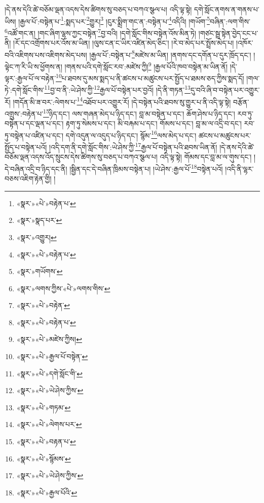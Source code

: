 །དེ་ནས་དེའི་ཚེ་བཅོམ་ལྡན་འདས་དེས་ཚིགས་སུ་བཅད་པ་བཀའ་སྩལ་པ། འདི་ལྟ་སྟེ། དགེ་སློང་ནགས་ན་གནས་པ་ཡིས། །རྒྱལ་པོ་:བསྟེན་པ་\footnote{«སྣར་»«པེ་»བརྟེན་པ་}:སྨད་པར་\footnote{«སྣར་»སྣད་པར་}གྱུར།\footnote{«སྣར་»འགྱུར།} །ངུར་སྨྲིག་གང་ན་:བསྟེན་པ་\footnote{«སྣར་»«པེ་»བརྟེན་པ་}འདིའི། །གཡོག་\footnote{«སྣར་»གཡོགས་}བཞིན་:ལག་གིས་\footnote{«སྣར་»ལགས་ཀྱིས་«པེ་»ལགས་གིས་}འཚོ་གང་ན། །གང་ཞིག་ལྷས་ཀྱང་བསྟེན་\footnote{«སྣར་»«པེ་»བརྟེན་}བྱ་བའི། །དགེ་སློང་གིས་བསྟེན་འོས་མིན་ཏེ། །གཙང་སྦྲ་སྟེན་བྱེད་ངང་པ་ནི། །རོ་དང་འགྲོགས་པར་འོས་མ་ཡིན། །ལུས་ངན་ང་ཡིར་འཛིན་མེད་ཅིང་། །རེ་བ་མེད་པར་སྤྲོས་མེད་པ། །འཁོར་བའི་འཇིགས་པས་འཇིགས་མེད་པས། །རྒྱལ་པོ་:བསྟེན་པ་\footnote{«སྣར་»«པེ་»བརྟེན་པ་}མཛེས་མ་ཡིན། །ནགས་དང་དགོན་པ་དུར་ཁྲོད་དང་། །ལྟེང་ཀ་རི་ཡི་ས་ཕྱོགས་ན། །གནས་པའི་དགེ་སློང་རབ་:མཛེས་ཀྱི།\footnote{«སྣར་»«པེ་»མཛེས་ཀྱིས།} །རྒྱལ་པོའི་ཁབ་བསྟེན་མ་ཡིན་ནོ། །དེ་ལྟར་:རྒྱལ་པོ་ལ་བརྟེན་\footnote{«སྣར་»«པེ་»རྒྱལ་པོ་བསྟེན་}པ་ཐབས་དུ་མས་སྨད་པ་ནི་ཚངས་པ་མཚུངས་པར་སྤྱོད་པ་ཐམས་ཅད་ཀྱིས་སྨད་དོ། །གལ་ཏེ་:དགེ་སློང་གིས་\footnote{«སྣར་»«པེ་»དགེ་སློང་གི་}བྱ་བ་ནི་:ཡེ་ཤེས་ཀྱི་\footnote{«སྣར་»«པེ་»ཡེ་ཤེས་ཀྱིས་}རྒྱལ་པོ་བསྟེན་པར་བྱའོ། །དེ་ནི་གཏན་\footnote{«སྣར་»«པེ་»གཏམ་}དུ་བའི་ཞི་བ་བསྟེན་པར་འགྱུར་རོ། །གདོན་མི་ཟ་བར་:ལེགས་པ་\footnote{«སྣར་»«པེ་»ལེགས་པར་}འཐོབ་པར་འགྱུར་རོ། །དེ་བསྟེན་པའི་ཐབས་སུ་གྱུར་པ་ནི་འདི་ལྟ་སྟེ། བརྩོན་འགྲུས་:བརྟེན་པ་\footnote{«སྣར་»«པེ་»བརྟན་པ་}ཉིད་དང་། ལས་གཞན་མེད་པ་ཉིད་དང་། བླ་མ་བསྟེན་པ་དང་། ཆོག་ཤེས་པ་ཉིད་དང་། རབ་ཏུ་བསྟེན་པ་དང་ལྡན་པ་དང་། རྟག་ཏུ་སེམས་པ་དང་། མི་བརྐམ་པ་དང་། གོམས་པ་དང་། བླ་མ་ལ་འདྲི་བ་དང་། རབ་ཏུ་བསྟེན་པ་འཛིན་པ་དང་། དགེ་འདུན་ལ་འདུད་པ་ཉིད་དང་། སྙོམ་\footnote{«སྣར་»«པེ་»སྙོམས་}ལས་མེད་པ་དང་། ཚངས་པ་མཚུངས་པར་སྤྱོད་པ་བསྟེན་པའོ། །འདི་དག་ནི་དགེ་སློང་གིས་:ཡེ་ཤེས་ཀྱི་\footnote{«སྣར་»«པེ་»ཡེ་ཤེས་ཀྱིས་}རྒྱལ་པོ་བསྟེན་པའི་ཐབས་ཡིན་ནོ། །དེ་ནས་དེའི་ཚེ་བཅོམ་ལྡན་འདས་འོད་སྲུངས་དེས་ཚིགས་སུ་བཅད་པ་བཀའ་སྩལ་པ། འདི་ལྟ་སྟེ། གོམས་དང་བླ་མ་ལ་གུས་དང་། །དེ་བཞིན་འདྲི་བ་ཉིད་དང་ནི། །སྦྱིན་དང་དེ་བཞིན་ཁྲིམས་བསྟེན་པ། །ཡེ་ཤེས་:རྒྱལ་པོ་\footnote{«སྣར་»«པེ་»རྒྱལ་པོའི་}བསྟེན་པའོ། །འདི་ནི་ལྷར་བཅས་འཇིག་རྟེན་གྱི། །
